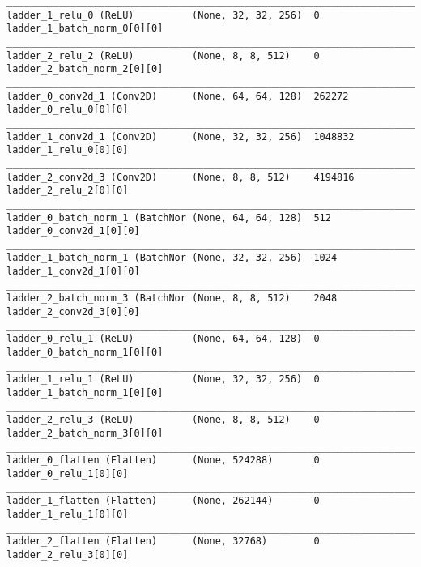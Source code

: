 \begin{lstlisting}[caption={CelebA-VLAE-GAN Encoder},captionpos=b,basicstyle=\tiny, label={lst:mnist-vlae-gan-encoder}]
__________________________________________________________________________________________________
ladder_1_relu_0 (ReLU)          (None, 32, 32, 256)  0           ladder_1_batch_norm_0[0][0]
__________________________________________________________________________________________________
ladder_2_relu_2 (ReLU)          (None, 8, 8, 512)    0           ladder_2_batch_norm_2[0][0]
__________________________________________________________________________________________________
ladder_0_conv2d_1 (Conv2D)      (None, 64, 64, 128)  262272      ladder_0_relu_0[0][0]
__________________________________________________________________________________________________
ladder_1_conv2d_1 (Conv2D)      (None, 32, 32, 256)  1048832     ladder_1_relu_0[0][0]
__________________________________________________________________________________________________
ladder_2_conv2d_3 (Conv2D)      (None, 8, 8, 512)    4194816     ladder_2_relu_2[0][0]
__________________________________________________________________________________________________
ladder_0_batch_norm_1 (BatchNor (None, 64, 64, 128)  512         ladder_0_conv2d_1[0][0]
__________________________________________________________________________________________________
ladder_1_batch_norm_1 (BatchNor (None, 32, 32, 256)  1024        ladder_1_conv2d_1[0][0]
__________________________________________________________________________________________________
ladder_2_batch_norm_3 (BatchNor (None, 8, 8, 512)    2048        ladder_2_conv2d_3[0][0]
__________________________________________________________________________________________________
ladder_0_relu_1 (ReLU)          (None, 64, 64, 128)  0           ladder_0_batch_norm_1[0][0]
__________________________________________________________________________________________________
ladder_1_relu_1 (ReLU)          (None, 32, 32, 256)  0           ladder_1_batch_norm_1[0][0]
__________________________________________________________________________________________________
ladder_2_relu_3 (ReLU)          (None, 8, 8, 512)    0           ladder_2_batch_norm_3[0][0]
__________________________________________________________________________________________________
ladder_0_flatten (Flatten)      (None, 524288)       0           ladder_0_relu_1[0][0]
__________________________________________________________________________________________________
ladder_1_flatten (Flatten)      (None, 262144)       0           ladder_1_relu_1[0][0]
__________________________________________________________________________________________________
ladder_2_flatten (Flatten)      (None, 32768)        0           ladder_2_relu_3[0][0]

\end{lstlisting}
